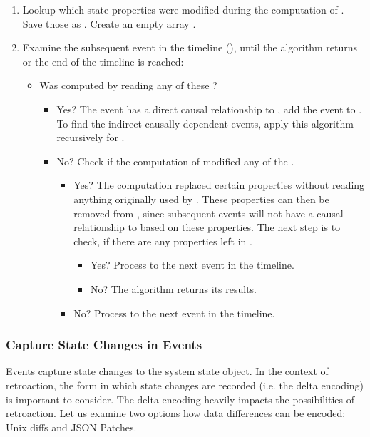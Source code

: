 \begin{enumerate}
	\item Lookup which state properties were modified during the computation 
	of . Save those as . Create 
	an empty array .

	\item Examine the subsequent event in the timeline (), 
	until the algorithm returns or the end of the timeline is reached: 
		\begin{itemize}
			\item Was  computed by reading any of these ? 

			\begin{itemize}
				\item Yes? The event has a direct causal
				relationship to , add the event to .
				To find the indirect causally dependent events, apply this algorithm recursively for .

				\item No? Check if the computation of
				 modified any of the .
				\begin{itemize}
					\item Yes? The computation replaced certain properties without reading anything
					originally used by .
					These properties can then be removed from , since 
					subsequent events will not have a causal relationship to  
					based on these properties. The next step is to check, if there are any properties left in .
					\begin{itemize}
						\item Yes? Process to the next event in the timeline.
						\item No? The algorithm returns its results.
					\end{itemize}
					\item No? Process to the next event in the timeline.
				\end{itemize}
			\end{itemize}

		\end{itemize}
\end{enumerate}


\subsubsection{Capture State Changes in Events}
\label{sec:capturing-changes}
Events capture state changes to the system state object.
In the context of retroaction, the form in which state changes are recorded 
(i.e. the delta encoding) is important to consider. The delta encoding heavily
impacts the possibilities of retroaction. Let us examine two options how 
data differences can be encoded: Unix diffs and JSON Patches.

